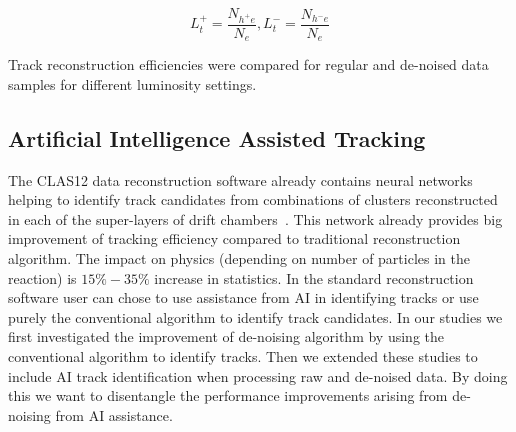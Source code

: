 \begin{equation}
L_t^+ = \frac{N_{h^+e}}{N_e} , L_t^- = \frac{N_{h^-e}}{N_e} 
\end{equation}

Track reconstruction efficiencies were compared for regular and de-noised data samples for different luminosity settings.

\subsection{Artificial Intelligence Assisted Tracking}

The CLAS12 data reconstruction software already contains neural networks helping to identify track candidates from combinations of clusters reconstructed in each of the super-layers of drift chambers~\cite{Gavalian:2022mlp}.
This network already provides big improvement of tracking efficiency compared to traditional reconstruction algorithm. The impact on physics (depending on number of particles in the reaction) is $15\%-35\%$ increase in statistics. 
In the standard reconstruction software user can chose to use assistance from AI in identifying tracks or use purely the conventional algorithm to identify track candidates. In our studies we first investigated the improvement of de-noising algorithm by using the conventional algorithm to identify tracks. Then we extended these studies to include AI track identification when processing raw and de-noised data. By doing this we want to disentangle the performance improvements arising from de-noising from AI assistance. 


 
